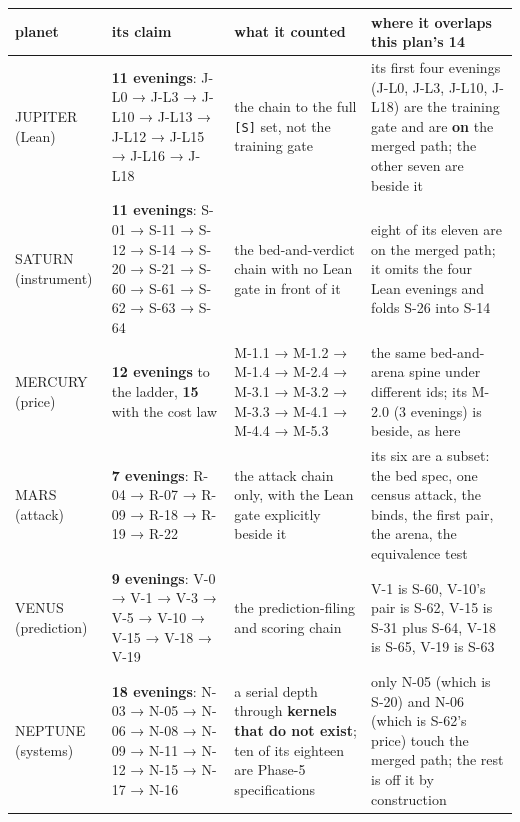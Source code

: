 \documentclass[11pt,a4paper]{article}
\newcounter{none}                 %
\theoremstyle{plain}
\theoremstyle{definition}
\theoremstyle{remark}
\begin{document}
{\def\LTcaptype{none} %
\begin{longtable}[]{@{}
  >{\raggedright\arraybackslash}p{}
  >{\raggedright\arraybackslash}p{}
  >{\raggedright\arraybackslash}p{}
  >{\raggedright\arraybackslash}p{}@{}}
\toprule\noalign{}
\begin{minipage}[b]{\linewidth}\raggedright
planet
\end{minipage} & \begin{minipage}[b]{\linewidth}\raggedright
its claim
\end{minipage} & \begin{minipage}[b]{\linewidth}\raggedright
what it counted
\end{minipage} & \begin{minipage}[b]{\linewidth}\raggedright
where it overlaps this plan's 14
\end{minipage} \\
\midrule\noalign{}
\endhead
\bottomrule\noalign{}
\endlastfoot
JUPITER (Lean) & \textbf{11 evenings}: J-L0 → J-L3 → J-L10 → J-L13 →
J-L12 → J-L15 → J-L16 → J-L18 & the chain to the full \texttt{{[}S{]}}
set, not the training gate & its first four evenings (J-L0, J-L3, J-L10,
J-L18) are the training gate and are \textbf{on} the merged path; the
other seven are beside it \\
SATURN (instrument) & \textbf{11 evenings}: S-01 → S-11 → S-12 → S-14 →
S-20 → S-21 → S-60 → S-61 → S-62 → S-63 → S-64 & the bed-and-verdict
chain with no Lean gate in front of it & eight of its eleven are on the
merged path; it omits the four Lean evenings and folds S-26 into S-14 \\
MERCURY (price) & \textbf{12 evenings} to the ladder, \textbf{15} with
the cost law & M-1.1 → M-1.2 → M-1.4 → M-2.4 → M-3.1 → M-3.2 → M-3.3 →
M-4.1 → M-4.4 → M-5.3 & the same bed-and-arena spine under different
ids; its M-2.0 (3 evenings) is beside, as here \\
MARS (attack) & \textbf{7 evenings}: R-04 → R-07 → R-09 → R-18 → R-19 →
R-22 & the attack chain only, with the Lean gate explicitly beside it &
its six are a subset: the bed spec, one census attack, the binds, the
first pair, the arena, the equivalence test \\
VENUS (prediction) & \textbf{9 evenings}: V-0 → V-1 → V-3 → V-5 → V-10 →
V-15 → V-18 → V-19 & the prediction-filing and scoring chain & V-1 is
S-60, V-10's pair is S-62, V-15 is S-31 plus S-64, V-18 is S-65, V-19 is
S-63 \\
NEPTUNE (systems) & \textbf{18 evenings}: N-03 → N-05 → N-06 → N-08 →
N-09 → N-11 → N-12 → N-15 → N-17 → N-16 & a serial depth through
\textbf{kernels that do not exist}; ten of its eighteen are Phase-5
specifications & only N-05 (which is S-20) and N-06 (which is S-62's
price) touch the merged path; the rest is off it by construction \\
\end{longtable}
}
\end{document}
